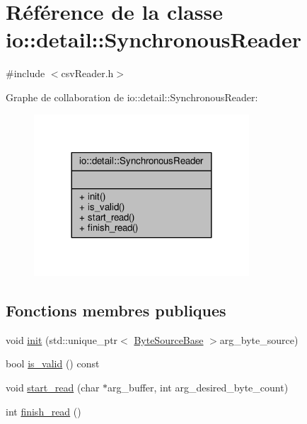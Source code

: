 \hypertarget{classio_1_1detail_1_1SynchronousReader}{}\section{Référence de la classe io\+:\+:detail\+:\+:Synchronous\+Reader}
\label{classio_1_1detail_1_1SynchronousReader}


{\ttfamily \#include $<$csv\+Reader.\+h$>$}



Graphe de collaboration de io\+:\+:detail\+:\+:Synchronous\+Reader\+:\nopagebreak
\begin{figure}[H]
\begin{center}
\leavevmode
\includegraphics[width=228pt]{classio_1_1detail_1_1SynchronousReader__coll__graph}
\end{center}
\end{figure}
\subsection*{Fonctions membres publiques}
\begin{DoxyCompactItemize}
\item 
void \hyperlink{classio_1_1detail_1_1SynchronousReader_a4dc78563ff667b92ad3096a94e834eb5}{init} (std\+::unique\+\_\+ptr$<$ \hyperlink{classio_1_1ByteSourceBase}{Byte\+Source\+Base} $>$arg\+\_\+byte\+\_\+source)
\item 
bool \hyperlink{classio_1_1detail_1_1SynchronousReader_a9d6b2c888cc7020df1bb81c8bb5c58bc}{is\+\_\+valid} () const
\item 
void \hyperlink{classio_1_1detail_1_1SynchronousReader_a6cad1371b97e14f660914898b16433c4}{start\+\_\+read} (char $\ast$arg\+\_\+buffer, int arg\+\_\+desired\+\_\+byte\+\_\+count)
\item 
int \hyperlink{classio_1_1detail_1_1SynchronousReader_a519a0cb25c641d2e51b6542749c44606}{finish\+\_\+read} ()
\end{DoxyCompactItemize}


